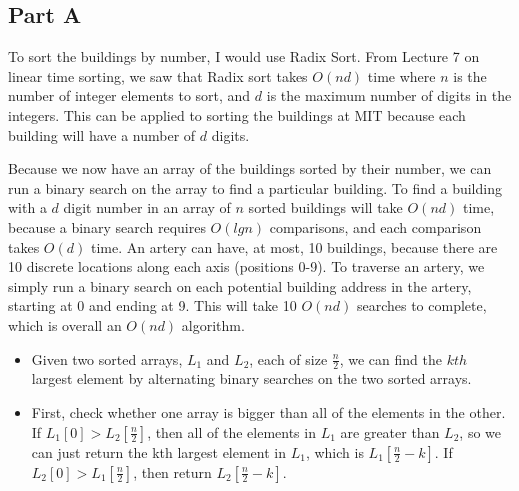 \documentclass[12pt,twoside]{article}
\begin{document}

\begin{problems}

\section*{Part A}

\problem  %

\begin{problemparts}
\problempart To sort the buildings by number, I would use Radix Sort. From Lecture 7 on linear time sorting, we saw that Radix sort takes $O(nd)$ time where $n$ is the number of integer elements to sort, and $d$ is the maximum number of digits in the integers. This can be applied to sorting the buildings at MIT because each building will have a number of $d$ digits.

\bigskip

\problempart Because we now have an array of the buildings sorted by their number, we can run a binary search on the array to find a particular building. To find a building with a $d$ digit number in an array of $n$ sorted buildings will take $O(nd)$ time, because a binary search requires $O(lg n)$ comparisons, and each comparison takes $O(d)$ time. An artery can have, at most, 10 buildings, because there are 10 discrete locations along each axis (positions 0-9). To traverse an artery, we simply run a binary search on each potential building address in the artery, starting at 0 and ending at 9. This will take 10 $O(nd)$ searches to complete, which is overall an $O(nd)$ algorithm.

\end{problemparts}

\problem  %

\begin{problemparts}
\problempart 

\begin{itemize} 

\item Given two sorted arrays, $L_1$ and $L_2$, each of size $\frac{n}{2}$, we can find the $kth$ largest element by alternating binary searches on the two sorted arrays. 
\item First, check whether one array is bigger than all of the elements in the other. If $L_1[0] > L_2[\frac{n}{2}]$, then all of the elements in $L_1$ are greater than $L_2$, so we can just return the kth largest element in $L_1$, which is $L_1[\frac{n}{2}-k]$. If $L_2[0] > L_1[\frac{n}{2}]$, then return $L_2[\frac{n}{2}-k]$.


\end{itemize}
\end{problemparts}
\end{problems}
\end{document}
